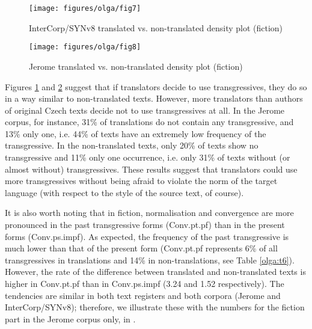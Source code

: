 \documentclass[output=paper,russian]{langsci/langscibook}
\begin{document}
\begin{figure}
  \texttt{[image: figures/olga/fig7]}
  \caption{InterCorp/SYNv8 translated vs. non-translated density plot (fiction)}\label{olga:f7}
\end{figure}

\begin{figure}
  \texttt{[image: figures/olga/fig8]}
  \caption{Jerome translated vs. non-translated density plot (fiction)}\label{olga:f8}
\end{figure}

Figures \ref{olga:f7} and \ref{olga:f8} suggest that if translators decide to use transgressives, they do so in a way similar to non-translated texts. However, more translators than authors of original Czech texts decide not to use transgressives at all. In the Jerome corpus, for instance, 31\% of translations do not contain any transgressive, and 13\% only one, i.e. 44\% of texts have an extremely low frequency of the transgressive. In the non-translated texts, only 20\% of texts show no transgressive and 11\% only one occurrence, i.e. only 31\% of texts without (or almost without) transgressives. These results suggest that translators could use more transgressives without being afraid to violate the norm of the target language (with respect to the style of the source text, of course). 

It is also worth noting that in fiction, normalisation and convergence are more pronounced in the past transgressive forms (Conv.pt.pf) than in the present forms (Conv.ps.impf). As expected, the frequency of the past transgressive is much lower than that of the present form (Conv.pt.pf represents 6\% of all transgressives in translations and 14\% in non-translations, see Table \ref{olga:t6}). However, the rate of the difference between translated and non-translated texts is higher in Conv.pt.pf than in Conv.ps.impf (3.24 and 1.52 respectively). The tendencies are similar in both text registers and both corpora (Jerome and InterCorp/SYNv8); therefore, we illustrate these with the numbers for the fiction part in the Jerome corpus only, in .
\end{document}
